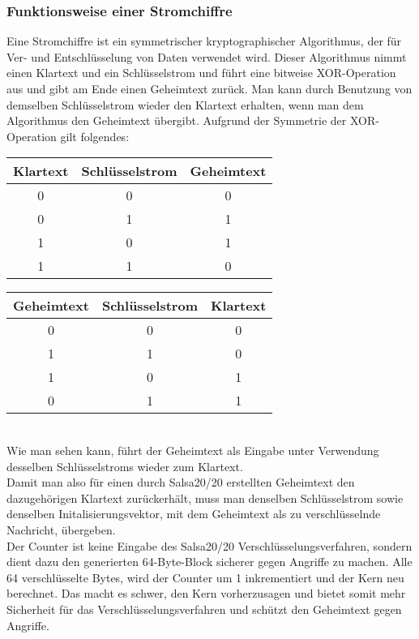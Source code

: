 \documentclass[course=erap]{aspdoc}
\begin{document}
\subsubsection{Funktionsweise einer Stromchiffre}
Eine Stromchiffre ist ein symmetrischer kryptographischer Algorithmus, der für Ver- und Entschlüsselung von Daten verwendet wird. 
Dieser Algorithmus nimmt einen Klartext und ein Schlüsselstrom und führt eine bitweise XOR-Operation aus und gibt am Ende einen Geheimtext zurück. 
Man kann durch Benutzung von demselben Schlüsselstrom wieder den Klartext erhalten, wenn man dem Algorithmus den Geheimtext übergibt.
Aufgrund der Symmetrie der XOR-Operation gilt folgendes:
\begin{table}[!h]
    \begin{tabular}{|c|c|c|}
    \hline
    Klartext & Schlüsselstrom & Geheimtext \\
    \hline
    0 & 0 & 0  \\
    0 & 1 & 1  \\
    1 & 0 & 1  \\
    1 & 1 & 0  \\
    \hline
    \end{tabular}
    \begin{tabular}{|c|c|c|}
        \hline
        Geheimtext & Schlüsselstrom & Klartext \\
        \hline
         0 & 0 & 0 \\
         1 & 1 & 0 \\
         1 & 0 & 1 \\
         0 & 1 & 1 \\
        \hline
        \end{tabular}
\end{table}
\\
Wie man sehen kann, führt der Geheimtext als Eingabe unter Verwendung desselben Schlüsselstroms wieder zum Klartext.
\vspace{3mm}
\\
Damit man also für einen durch Salsa20/20 erstellten Geheimtext den dazugehörigen Klartext zurückerhält, 
muss man denselben Schlüsselstrom sowie denselben Initalisierungsvektor, mit dem Geheimtext als zu verschlüsselnde Nachricht, übergeben.
\\
Der Counter ist keine Eingabe des Salsa20/20 Verschlüsselungsverfahren, sondern dient dazu den generierten 64-Byte-Block sicherer gegen Angriffe zu machen. Alle 64 verschlüsselte Bytes, wird der Counter um 1 inkrementiert und der Kern neu berechnet. Das macht es schwer, den Kern vorherzusagen und bietet somit mehr Sicherheit für das Verschlüsselungsverfahren und schützt den Geheimtext gegen Angriffe.
\end{document}
